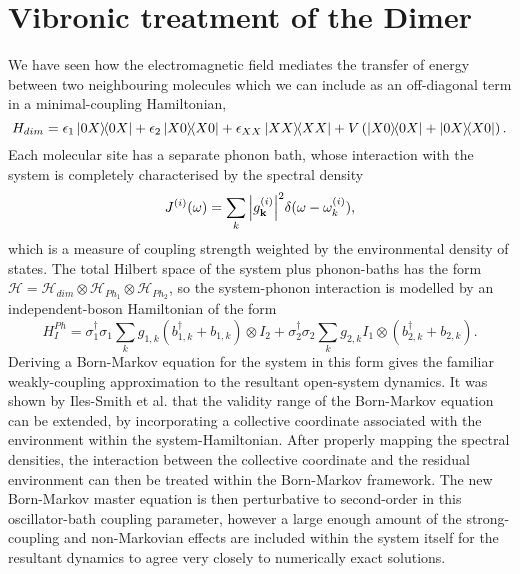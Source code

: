 \documentclass[]{article}
\begin{document}
\section{Vibronic treatment of the Dimer}
We have seen how the electromagnetic field mediates the transfer of energy between two neighbouring molecules which we can include as an off-diagonal term in a minimal-coupling Hamiltonian,
\begin{equation}
H_{dim} = \epsilon_{1}\dyad{0X} + \epsilon_{2}\dyad{X0} + \epsilon_{XX}\dyad{XX} + V\left(\dyad{X0}{0X} + \dyad{0X}{X0}\right).
\end{equation}
Each molecular site has a separate phonon bath, whose interaction with the system is completely characterised by the spectral density
\begin{equation}
J^{(i)} (\omega)= \sum_{k}\abs{g_{\textbf{k}}^{(i)}}^2 \delta (\omega-\omega_k^{(i)}),
\end{equation}
which is a measure of coupling strength weighted by the environmental density of states. The total Hilbert space of the system plus phonon-baths has the form $\mathcal{H}= \mathcal{H}_{dim} \otimes \mathcal{H}_{Ph_1} \otimes \mathcal{H}_{Ph_2}$, so the system-phonon interaction is modelled by an independent-boson Hamiltonian of the form
\begin{equation}
H_{I}^{Ph} = \sigma_1^{\dagger}\sigma_1\sum_{k}g_{1,k}(b_{1,k}^{\dagger} + b_{1,k})\otimes I_2 + \sigma_2^{\dagger}\sigma_2\sum_{k}g_{2,k}I_1\otimes (b_{2,k}^{\dagger} + b_{2,k}).
\end{equation}
Deriving a Born-Markov equation for the system in this form gives the familiar weakly-coupling approximation to the resultant open-system dynamics. It was shown by Iles-Smith et al. that the validity range of the Born-Markov equation can be extended, by incorporating a collective coordinate associated with the environment within the system-Hamiltonian. After properly mapping the spectral densities, the interaction between the collective coordinate and the residual environment can then be treated within the Born-Markov framework. The new Born-Markov master equation is then perturbative to second-order in this oscillator-bath coupling parameter, however a large enough amount of the strong-coupling and non-Markovian effects are included within the system itself for the resultant dynamics to agree very closely to numerically exact solutions. 
\end{document}
